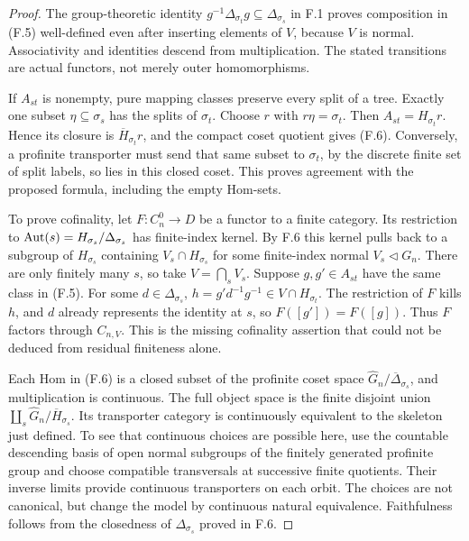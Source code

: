 \begin{proof}
The group-theoretic identity $g^{-1}\Delta_{\sigma_t}g\subseteq\Delta_{\sigma_s}$ in F.1 proves composition in (F.5) well-defined even after inserting elements of $V$, because $V$ is normal. Associativity and identities descend from multiplication. The stated transitions are actual functors, not merely outer homomorphisms.

If $A_{st}$ is nonempty, pure mapping classes preserve every split of a tree. Exactly one subset $\eta\subseteq\sigma_s$ has the splits of $\sigma_t$. Choose $r$ with $r\eta=\sigma_t$. Then
$A_{st}=H_{\sigma_t}r$. Hence its closure is $\overline H_{\sigma_t}r$, and the compact coset quotient gives (F.6). Conversely, a profinite transporter must send that same subset to $\sigma_t$, by the discrete finite set of split labels, so lies in this closed coset. This proves agreement with the proposed formula, including the empty Hom-sets.

To prove cofinality, let $F:C_n^0\to D$ be a functor to a finite category. Its restriction to $\operatorname{Aut}(s)=H_{\sigma_s}/\Delta_{\sigma_s}$ has finite-index kernel. By F.6 this kernel pulls back to a subgroup of $H_{\sigma_s}$ containing $V_s\cap H_{\sigma_s}$ for some finite-index normal $V_s\lhd G_n$. There are only finitely many $s$, so take $V=\bigcap_sV_s$. Suppose $g,g'\in A_{st}$ have the same class in (F.5). For some $d\in\Delta_{\sigma_s}$,
$h=g'd^{-1}g^{-1}\in V\cap H_{\sigma_t}$. The restriction of $F$ kills $h$, and $d$ already represents the identity at $s$, so $F([g'])=F([g])$. Thus $F$ factors through $C_{n,V}$. This is the missing cofinality assertion that could not be deduced from residual finiteness alone.

Each Hom in (F.6) is a closed subset of the profinite coset space $\widehat G_n/\overline\Delta_{\sigma_s}$, and multiplication is continuous. The full object space is the finite disjoint union $\coprod_s\widehat G_n/\overline H_{\sigma_s}$. Its transporter category is continuously equivalent to the skeleton just defined. To see that continuous choices are possible here, use the countable descending basis of open normal subgroups of the finitely generated profinite group and choose compatible transversals at successive finite quotients. Their inverse limits provide continuous transporters on each orbit. The choices are not canonical, but change the model by continuous natural equivalence. Faithfulness follows from the closedness of $\Delta_{\sigma_s}$ proved in F.6.
\end{proof}

